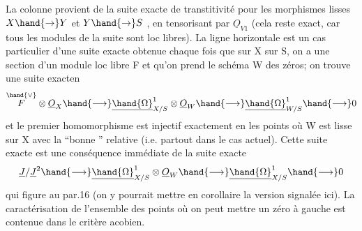
La colonne provient de la suite exacte de transtitivité pour les
morphismes lisses $X\hand{\to} Y$ et $Y\hand{\to} S$ , en  tensorisant par $\underline{O}_{V1}$ (cela reste
exact, car tous les modules de la suite sont loc libres). La ligne
horizontale est un cas particulier d'une suite exacte obtenue chaque
fois que sur X  sur S, on a une section \hand{$\mu$} d'un module loc libre F
et qu'on prend le schéma W des zéros; on trouve une suite exacten
\[ \overset{\hand{\vee}}{F}\otimes \underline{O}_X \hand{\longrightarrow} \underline{\hand{\Omega}}^1_{X/S}\otimes \underline{O}_W \hand{\longrightarrow} \underline{\hand{\Omega}}^1_{W/S} \hand{\longrightarrow} 0 \]
et  le premier homomorphisme est injectif exactement en les points où
W est lisse sur X avec la ``bonne ''  relative (i.e. partout dans
le cas actuel).  Cette suite exacte est 
  une
conséquence immédiate de la suite exacte
\[ \underline{J}/\underline{J}^2\hand{\longrightarrow} \underline{\hand{\Omega}}^1_{X/S}\otimes \underline{O}_W \hand{\longrightarrow} \underline{\hand{\Omega}}^1_{X/S} \hand{\longrightarrow} 0 \]
 qui figure au par.16 (on y pourrait mettre en corollaire la version
signalée ici). La caractérisation de l'ensemble des points où on
peut mettre un zéro à gauche est contenue dans le critère acobien.

